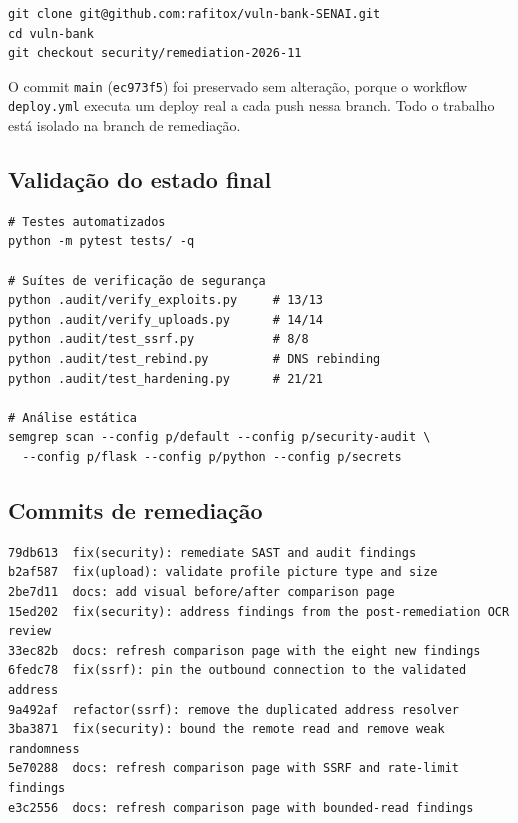 \documentclass[12pt,a4paper]{article}
\begin{document}
\begin{verbatim}
git clone git@github.com:rafitox/vuln-bank-SENAI.git
cd vuln-bank
git checkout security/remediation-2026-11
\end{verbatim}

O commit \texttt{main} (\texttt{ec973f5}) foi preservado sem alteração, porque
o workflow \texttt{deploy.yml} executa um deploy real a cada push nessa
branch. Todo o trabalho está isolado na branch de remediação.

\subsection{Validação do estado final}

\begin{verbatim}
# Testes automatizados
python -m pytest tests/ -q

# Suítes de verificação de segurança
python .audit/verify_exploits.py     # 13/13
python .audit/verify_uploads.py      # 14/14
python .audit/test_ssrf.py           # 8/8
python .audit/test_rebind.py         # DNS rebinding
python .audit/test_hardening.py      # 21/21

# Análise estática
semgrep scan --config p/default --config p/security-audit \
  --config p/flask --config p/python --config p/secrets
\end{verbatim}

\subsection{Commits de remediação}

\begin{verbatim}
79db613  fix(security): remediate SAST and audit findings
b2af587  fix(upload): validate profile picture type and size
2be7d11  docs: add visual before/after comparison page
15ed202  fix(security): address findings from the post-remediation OCR review
33ec82b  docs: refresh comparison page with the eight new findings
6fedc78  fix(ssrf): pin the outbound connection to the validated address
9a492af  refactor(ssrf): remove the duplicated address resolver
3ba3871  fix(security): bound the remote read and remove weak randomness
5e70288  docs: refresh comparison page with SSRF and rate-limit findings
e3c2556  docs: refresh comparison page with bounded-read findings
\end{verbatim}
\end{document}
